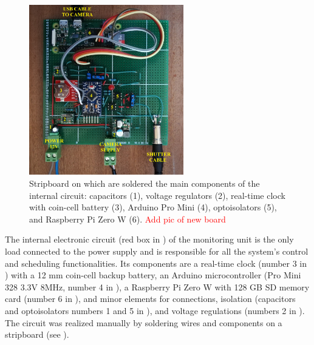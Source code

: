 \begin{figure}[ht!]
  \centering
  \includegraphics[width=0.6\textwidth]{board.jpg}
  \caption{Stripboard on which are soldered the main components of the internal
    circuit: capacitors (1), voltage regulators (2), real-time clock with coin-cell battery (3), Arduino Pro Mini (4), optoisolators (5), and Raspberry Pi Zero W (6). \textcolor{red}{Add pic of new board}}
  \label{fig:4:circuit}
\end{figure}

The internal electronic circuit (red box in ) of the
monitoring unit is the only load connected to the power supply and is responsible for all
the system's control and scheduling functionalities.
Its components are a real-time clock (number 3 in ) with a 12
mm
coin-cell backup battery, an Arduino microcontroller (Pro  Mini 328 3.3V 8MHz, number 4
in ), a Raspberry Pi Zero W with 128 GB SD memory card (number
6 in ), and minor elements for connections, isolation (capacitors and optoisolators numbers 1 and 5 in ), and voltage regulations (numbers 2 in ).
The circuit was realized manually by soldering wires and components on a stripboard (see ).

